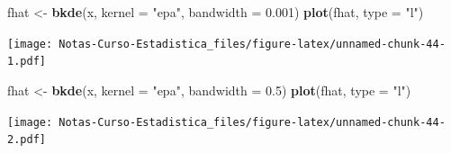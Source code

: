 \documentclass[
  12pt,
]{book}
\newenvironment{Shaded}{\begin{snugshade}}{\end{snugshade}}
\newcommand{\DataTypeTok}[1]{\textcolor[rgb]{0.13,0.29,0.53}{#1}}
\newcommand{\FloatTok}[1]{\textcolor[rgb]{0.00,0.00,0.81}{#1}}
\newcommand{\KeywordTok}[1]{\textcolor[rgb]{0.13,0.29,0.53}{\textbf{#1}}}
\newcommand{\NormalTok}[1]{#1}
\newcommand{\StringTok}[1]{\textcolor[rgb]{0.31,0.60,0.02}{#1}}
\theoremstyle{definition}
\theoremstyle{definition}
\theoremstyle{definition}
\theoremstyle{remark}
\begin{document}
\begin{Shaded}
\begin{Highlighting}[]
\NormalTok{fhat <-}\StringTok{ }\KeywordTok{bkde}\NormalTok{(x, }\DataTypeTok{kernel =} \StringTok{"epa"}\NormalTok{, }\DataTypeTok{bandwidth =} \FloatTok{0.001}\NormalTok{)}
\KeywordTok{plot}\NormalTok{(fhat, }\DataTypeTok{type =} \StringTok{"l"}\NormalTok{)}
\end{Highlighting}
\end{Shaded}

\texttt{[image: Notas-Curso-Estadistica\_files/figure-latex/unnamed-chunk-44-1.pdf]}

\begin{Shaded}
\begin{Highlighting}[]
\NormalTok{fhat <-}\StringTok{ }\KeywordTok{bkde}\NormalTok{(x, }\DataTypeTok{kernel =} \StringTok{"epa"}\NormalTok{, }\DataTypeTok{bandwidth =} \FloatTok{0.5}\NormalTok{)}
\KeywordTok{plot}\NormalTok{(fhat, }\DataTypeTok{type =} \StringTok{"l"}\NormalTok{)}
\end{Highlighting}
\end{Shaded}

\texttt{[image: Notas-Curso-Estadistica\_files/figure-latex/unnamed-chunk-44-2.pdf]}
\end{document}
